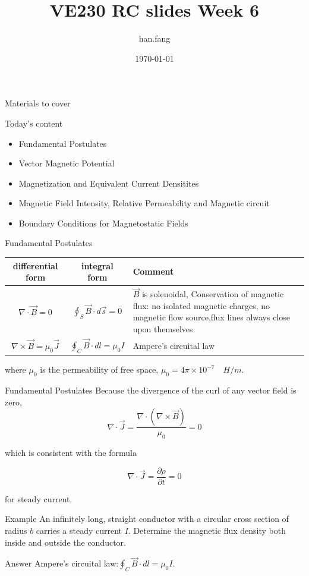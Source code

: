 \documentclass[xcolor={dvipsnames}]{beamer}
\title[VE230 RC slides week 5]{VE230 RC slides Week 6}
\author{han.fang }
\date{\today}
\begin{document}
\begin{frame}
\titlepage
\end{frame}
\begin{frame}{Materials to cover}
\begin{block}{Today's content}
	\begin{itemize}
		\item Fundamental Postulates
		\item Vector Magnetic Potential
		\item Magnetization and Equivalent Current Densitites
		\item Magnetic Field Intensity, Relative Permeability and
Magnetic circuit
		\item Boundary Conditions for Magnetostatic Fields
	\end{itemize}
\end{block}
\end{frame}
\begin{frame}{Fundamental Postulates}
\begin{table}[H]
  \centering
  \begin{tabular}{c|c|p{5cm}}
  differential form                    & integral form          & Comment            \\
  \hline
  $\nabla\cdot\vec{B}=0$              & $\oint_S\vec{B}\cdot d\vec{s}=0$  & $\vec{B}$ is solenoidal, \newline
  Conservation of magnetic flux: no isolated magnetic charges, no magnetic flow source,\newline flux lines always close upon themselves\\
  \hline
  $\nabla\times\vec{B}=\mu_0\vec{J}$ &  $\oint_C\vec{B}\cdot dl = \mu_0 I$           & Ampere's circuital law
  \end{tabular}
  \end{table}
where $\mu_0$ is the permeability of free space, $\mu_0 = 4\pi\times10^{-7} \quad H/m$.
\end{frame}
\begin{frame}{Fundamental Postulates}
Because the divergence of the curl of any vector field is zero, 
$$
\nabla\cdot \vec{J} = \frac{\nabla\cdot(\nabla\times\vec{B})}{\mu_0} = 0
$$ 

which is consistent with the formula 

$$
\nabla\cdot \vec{J} = \frac{\partial \rho}{\partial t} = 0
$$

for steady current.
\end{frame}
\begin{frame}{Example}
An infinitely long, straight conductor with a circular cross section of radius $b$ carries a steady current $I$. Determine the magnetic flux density both inside and outside the conductor.
\break
\pause
\begin{block}{Answer}
Ampere's circuital law:$\oint_C\vec{B}\cdot dl = \mu_0 I$.  
\end{block}        
\end{frame}
\end{document}
